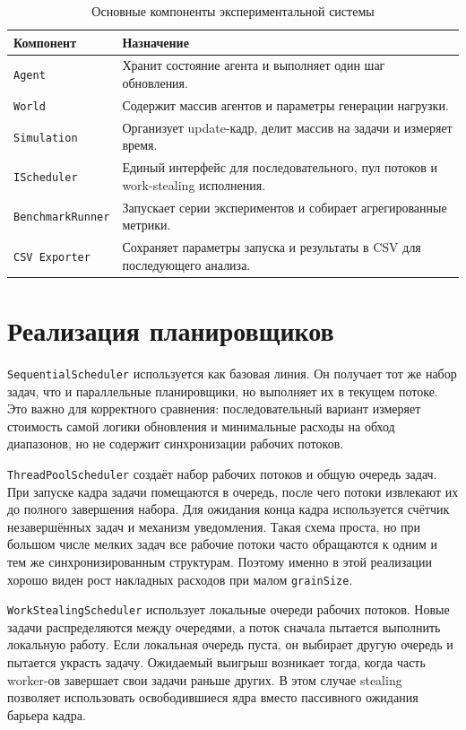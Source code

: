 \documentclass[14pt,a4paper,oneside]{extreport}
\begin{document}
\begin{table}[ht]
\centering
\small
\caption{Основные компоненты экспериментальной системы}
\label{tab:architecture}
\begin{tabularx}{\textwidth}{|p{}|X|}
\hline
Компонент & Назначение \\
\hline
\texttt{Agent} & Хранит состояние агента и выполняет один шаг обновления. \\
\hline
\texttt{World} & Содержит массив агентов и параметры генерации нагрузки. \\
\hline
\texttt{Simulation} & Организует update-кадр, делит массив на задачи и измеряет время. \\
\hline
\texttt{IScheduler} & Единый интерфейс для последовательного, пул потоков и work-stealing исполнения. \\
\hline
\texttt{BenchmarkRunner} & Запускает серии экспериментов и собирает агрегированные метрики. \\
\hline
\texttt{CSV Exporter} & Сохраняет параметры запуска и результаты в CSV для последующего анализа. \\
\hline
\end{tabularx}
\end{table}

\section{Реализация планировщиков}

\texttt{SequentialScheduler} используется как базовая линия. Он получает тот же набор задач, что и параллельные планировщики, но выполняет их в текущем потоке. Это важно для корректного сравнения: последовательный вариант измеряет стоимость самой логики обновления и минимальные расходы на обход диапазонов, но не содержит синхронизации рабочих потоков.

\texttt{ThreadPoolScheduler} создаёт набор рабочих потоков и общую очередь задач. При запуске кадра задачи помещаются в очередь, после чего потоки извлекают их до полного завершения набора. Для ожидания конца кадра используется счётчик незавершённых задач и механизм уведомления. Такая схема проста, но при большом числе мелких задач все рабочие потоки часто обращаются к одним и тем же синхронизированным структурам. Поэтому именно в этой реализации хорошо виден рост накладных расходов при малом \texttt{grainSize}.

\texttt{WorkStealingScheduler} использует локальные очереди рабочих потоков. Новые задачи распределяются между очередями, а поток сначала пытается выполнить локальную работу. Если локальная очередь пуста, он выбирает другую очередь и пытается украсть задачу. Ожидаемый выигрыш возникает тогда, когда часть worker-ов завершает свои задачи раньше других. В этом случае stealing позволяет использовать освободившиеся ядра вместо пассивного ожидания барьера кадра.
\end{document}

